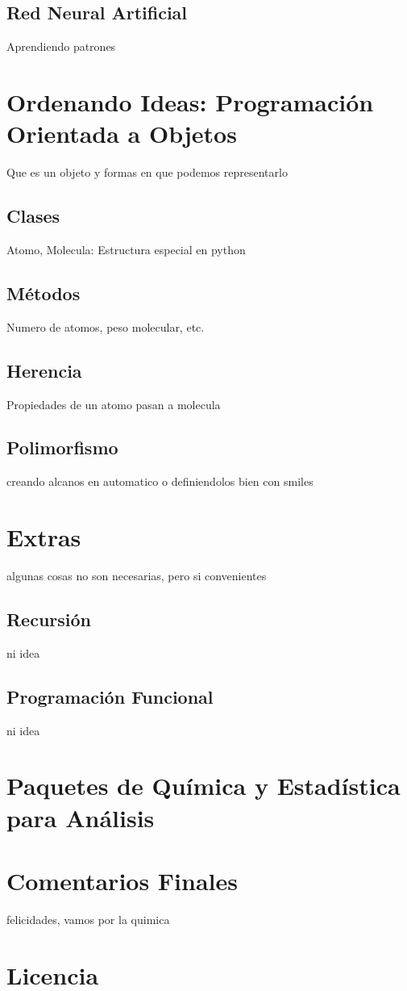 \documentclass[10pt,letterpaper]{article}
\begin{document}
\subsection{Red Neural Artificial}
Aprendiendo patrones
\section{Ordenando Ideas: Programaci\'on Orientada a Objetos}
Que es un objeto y formas en que podemos representarlo
\subsection{Clases}
Atomo, Molecula: Estructura especial en python
\subsection{M\'etodos}
Numero de atomos, peso molecular, etc.
\subsection{Herencia}
Propiedades de un atomo pasan a molecula
\subsection{Polimorfismo}
creando alcanos en automatico o definiendolos bien con smiles
\section{Extras}
algunas cosas no son necesarias, pero si convenientes
\subsection{Recursi\'on}
ni idea
\subsection{Programaci\'on Funcional}
ni idea
\section{Paquetes de Qu\'imica y Estad\'istica para An\'alisis}
\section{Comentarios Finales}
felicidades, vamos por la quimica

\section*{Licencia}
\end{document}
